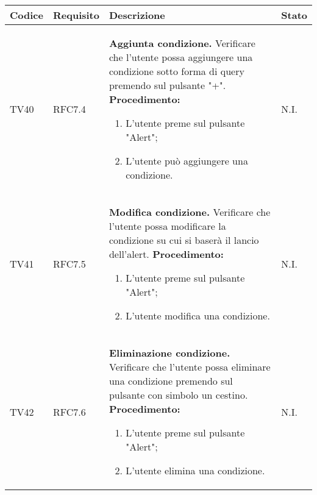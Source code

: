 \begin{table}[!htpb]
	\centering
	\renewcommand{\arraystretch}{2} 
	\begin{tabular}{|l|l|p{10cm}|l|}
		\rowcolor{orange!50}
		\hline
		\textbf{Codice} & \textbf{Requisito}& \textbf{Descrizione} & \textbf{Stato}\\ 
		\hline
		TV40 & RFC7.4 &
			\textbf{Aggiunta condizione.}
			\newline
			Verificare che l'utente possa aggiungere una condizione sotto forma di query premendo sul pulsante "+".
			\newline
			\textbf{Procedimento:}
			\begin{enumerate}
				\item L’utente preme sul pulsante "Alert";
				\item L’utente può aggiungere una condizione.
			\end{enumerate} 
			& N.I.\\
		\hline
		TV41 & RFC7.5 &
			\textbf{Modifica condizione.}
			\newline
			Verificare che l'utente possa modificare la condizione su cui si baserà il lancio dell’alert.
			\newline
			\textbf{Procedimento:}
			\begin{enumerate}
				\item L’utente preme sul pulsante "Alert";
				\item L’utente modifica una condizione.
			\end{enumerate} 
			& N.I.\\
		\hline
		TV42 & RFC7.6 &
			\textbf{Eliminazione condizione.}
			\newline
			Verificare che l'utente possa eliminare una condizione premendo sul pulsante con simbolo un cestino.
			\newline
			\textbf{Procedimento:}
			\begin{enumerate}
				\item L’utente preme sul pulsante "Alert";
				\item L’utente elimina una condizione.
			\end{enumerate} 
			& N.I.\\
		\hline
	\end{tabular}
\end{table}
